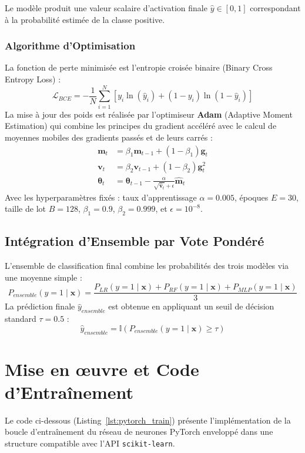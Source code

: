\documentclass[12pt,a4paper]{article}
\begin{document}
Le modèle produit une valeur scalaire d'activation finale $\hat{y} \in [0, 1]$ correspondant à la probabilité estimée de la classe positive.

\subsubsection{Algorithme d'Optimisation}
La fonction de perte minimisée est l'entropie croisée binaire (Binary Cross Entropy Loss) :
\begin{equation}
    \mathcal{L}_{BCE} = -\frac{1}{N}\sum_{i=1}^{N} \left[ y_i \ln(\hat{y}_i) + (1-y_i) \ln(1-\hat{y}_i) \right]
\end{equation}
La mise à jour des poids est réalisée par l'optimiseur \textbf{Adam} (Adaptive Moment Estimation) qui combine les principes du gradient accéléré avec le calcul de moyennes mobiles des gradients passés et de leurs carrés :
\begin{align}
    \mathbf{m}_t &= \beta_1 \mathbf{m}_{t-1} + (1-\beta_1) \mathbf{g}_t \\
    \mathbf{v}_t &= \beta_2 \mathbf{v}_{t-1} + (1-\beta_2) \mathbf{g}_t^2 \\
    \boldsymbol{\theta}_t &= \boldsymbol{\theta}_{t-1} - \frac{\alpha}{\sqrt{\hat{\mathbf{v}}_t} + \epsilon} \hat{\mathbf{m}}_t
\end{align}
Avec les hyperparamètres fixés : taux d'apprentissage $\alpha = 0.005$, époques $E=30$, taille de lot $B=128$, $\beta_1=0.9$, $\beta_2=0.999$, et $\epsilon=10^{-8}$.

\subsection{Intégration d'Ensemble par Vote Pondéré}
L'ensemble de classification final combine les probabilités des trois modèles via une moyenne simple :
\begin{equation}
    P_{ensemble}(y=1 \mid \mathbf{x}) = \frac{P_{LR}(y=1 \mid \mathbf{x}) + P_{RF}(y=1 \mid \mathbf{x}) + P_{MLP}(y=1 \mid \mathbf{x})}{3}
\end{equation}
La prédiction finale $\hat{y}_{ensemble}$ est obtenue en appliquant un seuil de décision standard $\tau = 0.5$ :
\begin{equation}
    \hat{y}_{ensemble} = \mathbb{I}\left( P_{ensemble}(y=1 \mid \mathbf{x}) \ge \tau \right)
\end{equation}

\section{Mise en \oe{}uvre et Code d'Entraînement}
Le code ci-dessous (Listing~\ref{lst:pytorch_train}) présente l'implémentation de la boucle d'entraînement du réseau de neurones PyTorch enveloppé dans une structure compatible avec l'API \texttt{scikit-learn}.
\end{document}
